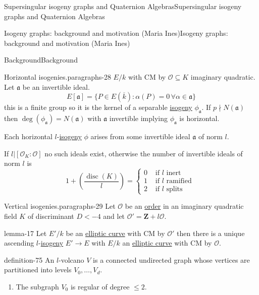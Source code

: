 \documentclass[10pt,]{book}
\numberwithin{equation}{section}
\newcommand{\ideal}[1]{\mathfrak{#1}}
\newcommand{\lb}{[}
\newcommand{\rb}{]}
\newcommand{\ZZ}{\mathbf{Z}}
\newcommand{\ints}{\mathcal{O}}
\DeclareMathOperator{\disc}{disc}
\newcommand{\lt}{<}
\newcommand{\amp}{&}
\begin{document}
\begin{chapterptx}{Supersingular isogeny graphs and Quaternion Algebras}{}{Supersingular isogeny graphs and Quaternion Algebras}{}{}
\begin{sectionptx}{Isogeny graphs: background and motivation (Maria Ines)}{}{Isogeny graphs: background and motivation (Maria Ines)}{}{}
\begin{subsectionptx}{Background}{}{Background}{}{}
\begin{paragraphs}{Horizontal isogenies.}{paragraphs-28}%
\hypertarget{p-812}{}%
\(E/k\) with CM by \(\ints \subseteq K\) imaginary quadratic. Let \(\ideal a\) be an invertible ideal.%
\begin{equation*}
E\lb \ideal a \rb = \{ P \in E(\overline k) : \alpha (P)  = 0\, \forall \alpha \in \ideal a\}
\end{equation*}
this is a finite group so it is the kernel of a separable \hyperref[def-supersing-isog-isog]{isogeny} \(\phi_{\ideal a }\). If \(p \nmid N(\ideal a)\) then \(\deg(\phi_{\ideal a}) = N(\ideal a)\) with \(\ideal a\) invertible implying \(\phi_{\ideal a} \) is horizontal.%
\par
\hypertarget{p-813}{}%
Each horizontal \(l\)-\hyperref[def-supersing-isog-isog]{isogeny} \(\phi\) arises from some invertible ideal \(\ideal a\) of norm \(l\).%
\par
\hypertarget{p-814}{}%
If \(l | \lb \ints_K : \ints \rb \) no such ideals exist, otherwise the number of invertible ideals of norm \(l\) is%
\begin{equation*}
1+ \left(\frac {\disc(K)}{l}\right) = \begin{cases}0\amp\text{ if }l \text{ inert }\\ 1\amp\text{ if }l \text{ ramified }\\ 2\amp\text{ if }l \text{ splits}\end{cases}
\end{equation*}
%
\end{paragraphs}%
\begin{paragraphs}{Vertical isogenies.}{paragraphs-29}%
\hypertarget{p-815}{}%
Let \(\ints\) be an \hyperref[def-order-quaternion]{order} in an imaginary quadratic field \(K \) of discriminant \(D \lt -4\) and let \(\ints' = \ZZ+l\ints\).%
\begin{lemma}{}{}{lemma-17}%
\hypertarget{p-816}{}%
Let \(E' / k\)  be an \hyperref[def-supersing-isog-ec]{elliptic curve} with CM by \(\ints '\) then there is a  unique ascending \(l\)-\hyperref[def-supersing-isog-isog]{isogeny} \(E'\to E\) with \(E/k\) an \hyperref[def-supersing-isog-ec]{elliptic curve} with CM by \(\ints\).%
\end{lemma}
\begin{definition}{}{definition-75}%
\hypertarget{p-817}{}%
An \(l\)-volcano \(V\) is a connected undirected graph whose vertices are partitioned into levels \(V_0, \ldots, V_d\).\leavevmode%
\begin{enumerate}
\item\hypertarget{li-197}{}The subgraph \(V_0\) is regular of degree \(\le 2\).%

\end{enumerate}
\end{definition}
\end{paragraphs}
\end{subsectionptx}
\end{sectionptx}
\end{chapterptx}
\end{document}
